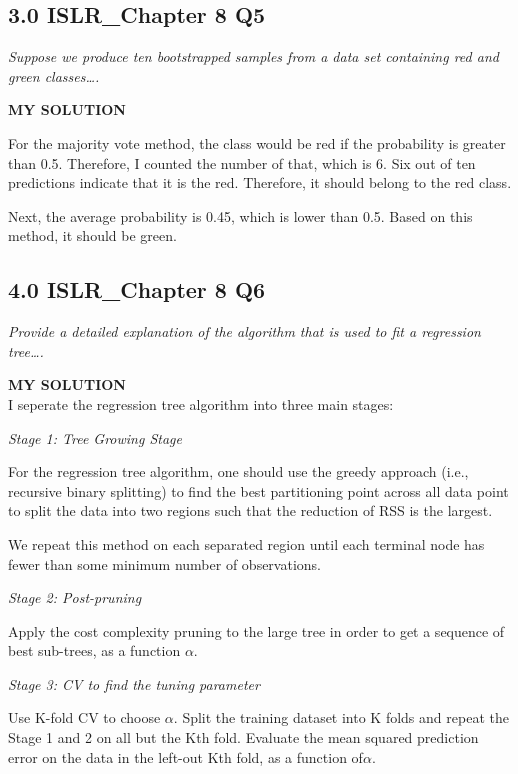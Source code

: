 \documentclass[
]{article}
\begin{document}
\hypertarget{islr_chapter-8-q5}{%
\subsection{3.0 ISLR\_Chapter 8 Q5}\label{islr_chapter-8-q5}}

\emph{Suppose we produce ten bootstrapped samples from a data set
containing red and green classes\ldots.}

\textbf{MY SOLUTION}

For the majority vote method, the class would be red if the probability
is greater than 0.5. Therefore, I counted the number of that, which is
6. Six out of ten predictions indicate that it is the red. Therefore, it
should belong to the red class.

Next, the average probability is 0.45, which is lower than 0.5. Based on
this method, it should be green.

\hypertarget{islr_chapter-8-q6}{%
\subsection{4.0 ISLR\_Chapter 8 Q6}\label{islr_chapter-8-q6}}

\emph{Provide a detailed explanation of the algorithm that is used to
fit a regression tree\ldots.}

\textbf{MY SOLUTION}\\
I seperate the regression tree algorithm into three main stages:

\emph{Stage 1: Tree Growing Stage}

For the regression tree algorithm, one should use the greedy approach
(i.e., recursive binary splitting) to find the best partitioning point
across all data point to split the data into two regions such that the
reduction of RSS is the largest.

We repeat this method on each separated region until each terminal node
has fewer than some minimum number of observations.

\emph{Stage 2: Post-pruning}

Apply the cost complexity pruning to the large tree in order to get a
sequence of best sub-trees, as a function \(\alpha.\)

\emph{Stage 3: CV to find the tuning parameter}

Use K-fold CV to choose \(\alpha.\) Split the training dataset into K
folds and repeat the Stage 1 and 2 on all but the Kth fold. Evaluate the
mean squared prediction error on the data in the left-out Kth fold, as a
function of\(\alpha.\)
\end{document}
